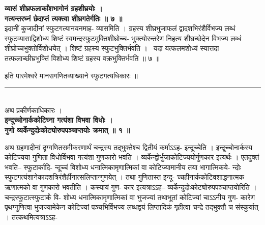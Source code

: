 \documentclass[11pt, openany]{book}
\begin{document}
{{{{\vspace{2mm}
\centering
\textbf{
\hspace{-1cm}
 व्यासं शीघ्रफलार्कांशभागोनं ग्रहशीघ्रयोः ।\\
 गत्यन्तरघ्नं छेदाप्तं त्यक्त्वा शीघ्रगतेर्गतिः ॥ ७ ॥}\\

\vspace{2mm}
\justifying
 इदानीं कुजादीनां स्फुटगत्यानयनमाह- व्यासमिति । ग्रहस्य
शीघ्रभुजाफलं
द्वादशभिरंशैर्विभज्य लब्धं स्फुटव्यासाद्विशोध्य शिष्टं
स्वमन्दस्फुटमुक्तिशीघ्रोच्च-
भुक्त्योरन्तरेण निहत्य शीघ्रच्छेदेन विभज्य लब्धं
शीघ्रोच्चभुक्तोर्विशोधयेत् ।
शिष्टं ग्रहस्य स्फुटभुक्तिर्भवति ।  यदा यत्फलमशोध्यं स्यात्तदा
तत्फलाच्छीघ्रभुक्तिं
विशोध्य शिष्टं ग्रहस्य वक्रभुक्तिर्भवति ॥ ७ ॥

\centering
 इति पारमेश्वरे मानसगणितव्याख्याने स्फुटगत्यधिकारः ॥\\

\rule{0.2\linewidth}{1.0pt}\\

\vspace{3mm}
\centering
 अथ प्रकीर्णकाधिकारः ।\\

\vspace{2mm}
\centering
\textbf{
 इन्दूच्चोनार्ककोटिघ्ना गत्यंशा विभवा विधोः ।\\
 गुणो व्यर्केन्दुदोःकोट्योरुपपञ्चाप्तयोः क्रमात् ॥ १ ॥}


\newpage
\thispagestyle{fancy}
\fancyhf{}
\rhead{[प्रकीर्णकाधिकारः]}
\justifying
 अथ ग्रहणादीनां दृग्गणितसमीकरणार्थं चन्द्रस्य तद्भुक्तेश्च द्वितीयं
कर्माऽऽह-
इन्दूच्चेति । इन्दूच्चोनार्कस्य कोटिज्यया गुणिता विधोर्विभवा गत्यंशा
गुणकारो 
भवति । व्यर्केन्द्वोर्भुजाकोटिज्ययोर्गुणकार इत्यर्थः । एतदुक्तं
भवति-- स्फुटार्कादि-
न्दूच्चं विशोध्य धनात्मिकामृणात्मिकां वा कोटिज्यामानीय तया
भागात्मिकये-
न्दोः स्फुटगत्यंशानेकादशत्रिरंशैर्हीनात्सलिप्तान्गुणयेत् । तथा
गुणितास्त इन्दू-
च्चहीनार्ककोटिवशाद्धनात्मक ऋणात्मको वा गुणकारो भवतीति । कस्यायं गुण-
कार इत्यत्राऽऽह-- व्यर्केन्दुदोःकोट्योरुपपञ्चाप्तयोरिति ।
चन्द्रस्फुटात्स्फुटार्कं वि-
शोध्य धनात्मिकामृणात्मिकां वा भुजज्यां तथाभूतां कोटिज्यां चाऽऽनीय गुण-
कारेण पृथग्गुणित्वा भुजज्यामेकेन कोटिज्यां पञ्चभिर्विभज्य लब्धद्वयं
लिप्तादिकं 
गृहीत्वा चन्द्रे तद्भुक्तौ च संस्कुर्यात् । तत्कथमित्यत्राऽऽह-

}}}}
\end{document}
